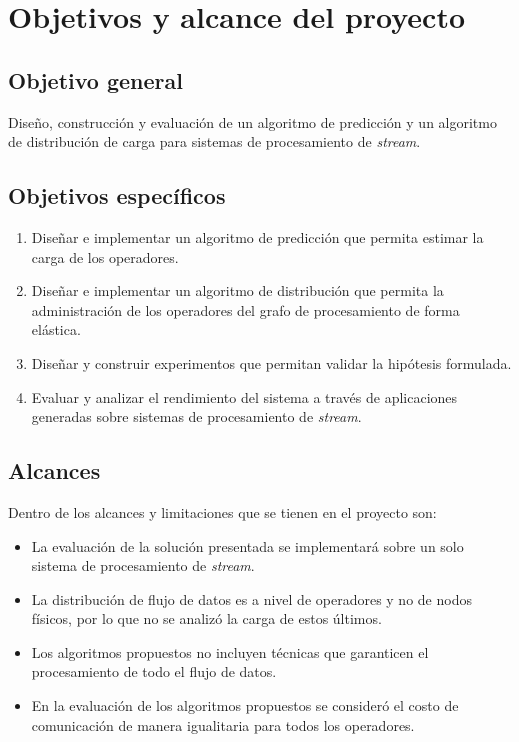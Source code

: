 \section{Objetivos y alcance del proyecto}
\label{intro:objetivos}

\subsection{Objetivo general}
	Dise\~no, construcción y evaluaci\'on de un algoritmo de predicci\'on y un algoritmo de distribuci\'on de carga para sistemas de procesamiento de \textit{stream}.

\subsection{Objetivos específicos}
\begin{enumerate}
	\item Dise\~nar e implementar un algoritmo de predicci\'on que permita estimar la carga de los operadores.
	\item Dise\~nar e implementar un algoritmo de distribuci\'on que permita la administraci\'on de los operadores del grafo de procesamiento de forma el\'astica.
	\item Dise\~nar y construir experimentos que permitan validar la hip\'otesis formulada.
	\item Evaluar y analizar el rendimiento del sistema a trav\'es de aplicaciones generadas sobre sistemas de procesamiento de \textit{stream}.
\end{enumerate}

\subsection{Alcances}
Dentro de los alcances y limitaciones que se tienen en el proyecto son:
\begin{itemize}
	\item La evaluación de la solución presentada se implementará sobre un solo sistema de procesamiento de \textit{stream}.
	\item La distribución de flujo de datos es a nivel de operadores y no de nodos f\'isicos, por lo que no se analizó la carga de estos \'ultimos.
	\item Los algoritmos propuestos no incluyen t\'ecnicas que garanticen el procesamiento de todo el flujo de datos.
	\item En la evaluación de los algoritmos propuestos se consideró el costo de comunicación de manera igualitaria para todos los operadores.
\end{itemize}


